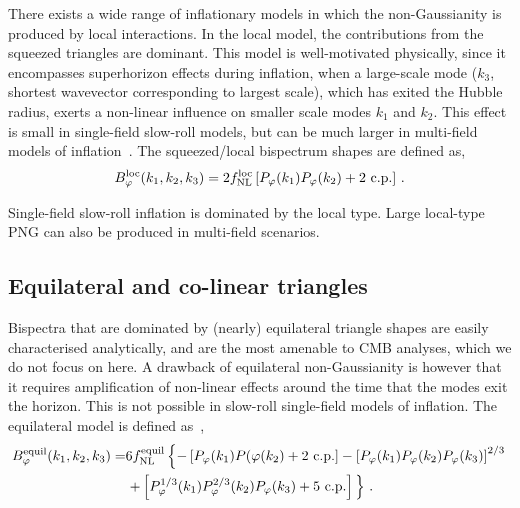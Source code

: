 There exists a wide range of inflationary models in which the non-Gaussianity is produced by local interactions. In the local model, the contributions from the squeezed triangles are dominant. This model is well-motivated physically, since it encompasses superhorizon effects during inflation, when a large-scale mode ($k_3$, shortest wavevector corresponding to largest scale), which has exited the Hubble radius, exerts a non-linear influence on smaller scale modes $k_1$ and $k_2$. This effect is small in single-field slow-roll models, but can be much larger in multi-field models of inflation~\cite{Liguori:2010hx}. 
The squeezed/local bispectrum shapes are defined as, 
\begin{equation}
	B_\varphi^\mathrm{loc}(k_1,k_2,k_3) = 2 f_\text{NL}^\mathrm{loc} \left[ P_\varphi(k_1) P_\varphi(k_2) + 2\text{ c.p.} \right]\,.
\end{equation}

Single-field slow-roll inflation is dominated by the local type. Large local-type PNG can also be produced in multi-field scenarios. 

\iffalse
\subsection{Equilateral and co-linear triangles}

Bispectra that are dominated by (nearly) equilateral triangle shapes are easily characterised analytically, and are the most amenable to CMB analyses, which we do not focus on here. A drawback of equilateral non-Gaussianity is however that it requires amplification of non-linear effects around the time that the modes exit the horizon. This is not possible in slow-roll single-field models of inflation. The equilateral model is defined as~\cite{Karagiannis:2018jdt}, 
\begin{align}
	B_\varphi^\mathrm{equil}(k_1,k_2,k_3) =& 6 \fnl^\mathrm{equil} \left\{ - \left[ P_\varphi(k_1) P(\varphi(k_2) + 2\text{ c.p.} \right] - \left[ P_\varphi(k_1) P_\varphi(k_2) P_\varphi(k_3) \right]^{2/3} \right. \nonumber \\
	&\left. + \left[ P_\varphi^{1/3}(k_1) P_\varphi^{2/3}(k_2) P_\varphi(k_3) + 5\text{ c.p.} \right] \vphantom{\left[ P_\varphi \right]^{1/3}}\right\}\,.
\end{align}

